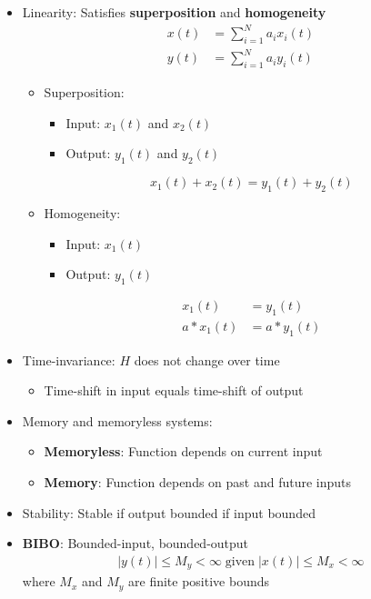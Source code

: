 \documentclass[conference]{IEEEtran}
\begin{document}
\begin{itemize}
  \item Linearity: Satisfies \textbf{superposition} and \textbf{homogeneity}
  \begin{align*}
    x(t) &= \sum_{i=1}^N a_i x_i(t) \\
    y(t) &= \sum_{i=1}^N a_i y_i(t) 
  \end{align*}
  \begin{itemize}
    \item Superposition: 
    \begin{itemize}
      \item Input: $x_1(t)$ and $x_2(t)$
      \item Output: $y_1(t)$ and $y_2(t)$
    \end{itemize}
    $$
      x_1(t) + x_2(t) = y_1(t) + y_2(t)
    $$

    \item Homogeneity:
    \begin{itemize}
      \item Input: $x_1(t)$ 
      \item Output: $y_1(t)$
    \end{itemize}
    \begin{align*}
      x_1(t) &= y_1(t) \\
      a*x_1(t) &= a*y_1(t)
    \end{align*}
  \end{itemize}

  \item Time-invariance: $H$ does not change over time 
  \begin{itemize}
    \item Time-shift in input equals time-shift of output
  \end{itemize}

  \item Memory and memoryless systems: 
  \begin{itemize}
    \item \textbf{Memoryless}: Function depends on current input
    \item \textbf{Memory}: Function depends on past and future inputs
  \end{itemize}

  \item Stability: Stable if output bounded if input bounded 
  \item \textbf{BIBO}: Bounded-input, bounded-output
  \begin{align*}
    |y(t)| \leq M_y < \infty \; \text{given} \; |x(t)| \leq M_x < \infty
  \end{align*}
  where $M_x$ and $M_y$ are finite positive bounds 


\end{itemize}
\end{document}

